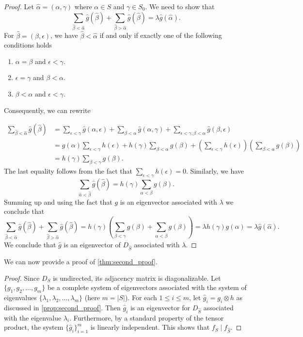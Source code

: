 \documentclass[11pt,a4paper]{amsart}
\theoremstyle{definition}
\numberwithin{equation}{section}
\begin{document}
\begin{proof}
Let $\widehat{\alpha} = (\alpha, \gamma)$ where $\alpha \in S$ and $\gamma \in S_0.$ We need to show that 
\[ \sum_{\widehat{\beta} < \widehat{\alpha}} \widehat{g}(\widehat{\beta}) + \sum_{\widehat{\beta} > \widehat{\alpha}} \widehat{g}(\widehat{\beta})  = \lambda \widehat{g}(\widehat{\alpha}).\]
For $\widehat{\beta}  = (\beta, \epsilon)$, we have $\widehat{\beta} < \widehat{\alpha}$ if and only if exactly one of the following conditions holds  

\begin{enumerate}
    \item $\alpha=\beta$ and $\epsilon < \gamma$. 
    \item $\epsilon = \gamma$ and $\beta< \alpha$.
    \item $\beta< \alpha$ and $\epsilon < \gamma.$
\end{enumerate}

Consequently, we can rewrite 

\begin{align*}
\sum_{\widehat{\beta} < \widehat{\alpha}} \widehat{g}(\widehat{\beta}) &= \sum_{\epsilon < \gamma} \widehat{g}(\alpha, \epsilon) + \sum_{\beta < \alpha} \widehat{g}(\alpha, \gamma) + \sum_{\epsilon < \gamma, \beta<\alpha} \widehat{g}(\beta, \epsilon) \\ 
& = g(\alpha) \sum_{\epsilon < \gamma} h(\epsilon) + h(\gamma) \sum_{\beta< \alpha} g(\beta) + \left(\sum_{\epsilon<\gamma} h(\epsilon) \right) \left(\sum_{\beta<\alpha} g(\beta) \right) \\
& =  h(\gamma) \sum_{ \beta < \gamma} g(\beta).
\end{align*}
The last equality follows from the fact that $\sum_{\epsilon <\gamma}h(\epsilon)=0.$ Similarly, we have 
\[ \sum_{\widehat{\alpha}<\widehat{\beta} } \widehat{g}(\widehat{\beta})  = h(\gamma) \sum_{\alpha< \beta} g(\beta).\]
Summing up and using the fact that $g$ is an eigenvector associated with $\lambda$ we conclude that 
\[ \sum_{\widehat{\beta} < \widehat{\alpha}} \widehat{g}(\widehat{\beta}) + \sum_{\widehat{\beta} > \widehat{\alpha}} \widehat{g}(\widehat{\beta}) = h(\gamma) \left( \sum_{ \beta < \gamma} g(\beta) +\sum_{ \alpha < \beta} g(\beta) \right) =  \lambda h(\gamma) g(\alpha) = \lambda \widehat{g}(\widehat{\alpha}).\] 
We conclude that $\widehat{g}$ is an eigenvector of $D_{\widehat{S}}$ associated with $\lambda.$
\end{proof}

We can now provide a proof of \cref{thm:second_proof}. 
\begin{proof}
Since $D_{S}$ is undirected, its adjacency matrix is diagonalizable. Let $\{g_1, g_2, \ldots, g_m\}$ be a complete system of eigenvectors associated with the system of eigenvalues $\{\lambda_1, \lambda_2,  \ldots, \lambda_m\}$ (here $m=|S|$). For each $1 \leq i \leq m$, let $\widehat{g}_i = g_i \otimes h $ as discussed in \cref{prop:second_proof}. Then $\widehat{g}_i$ is an eigenvector for $D_{\widehat{S}}$ associated with the eigenvalue $\lambda_i.$ Furthermore, by a standard property of the tensor product, the system $\{\widehat{g}_i\}_{i=1}^m$ is linearly independent. This shows that $f_{S} \mid f_{\widehat{S}}.$
\end{proof}
\end{document}
